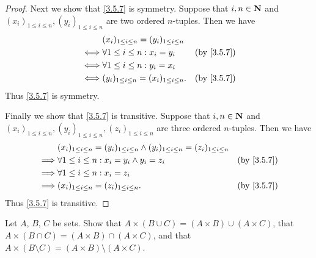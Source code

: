 \begin{proof}
  Next we show that \cref{3.5.7} is symmetry.
  Suppose that \(i, n \in \mathbf{N}\) and \((x_i)_{1 \leq i \leq n}, (y_i)_{1 \leq i \leq n}\) are two ordered \(n\)-tuples.
  Then we have
  \begin{align*}
         & (x_i)_{1 \leq i \leq n} = (y_i)_{1 \leq i \leq n}                             \\
    \iff & \forall 1 \leq i \leq n : x_i = y_i                & \text{(by \cref{3.5.7})} \\
    \iff & \forall 1 \leq i \leq n : y_i = x_i                                           \\
    \iff & (y_i)_{1 \leq i \leq n} = (x_i)_{1 \leq i \leq n}. & \text{(by \cref{3.5.7})}
  \end{align*}
  Thus \cref{3.5.7} is symmetry.

  Finally we show that \cref{3.5.7} is transitive.
  Suppose that \(i, n \in \mathbf{N}\) and \((x_i)_{1 \leq i \leq n}, (y_i)_{1 \leq i \leq n}, (z_i)_{1 \leq i \leq n}\) are three ordered \(n\)-tuples.
  Then we have
  \begin{align*}
             & (x_i)_{1 \leq i \leq n} = (y_i)_{1 \leq i \leq n} \land (y_i)_{1 \leq i \leq n} = (z_i)_{1 \leq i \leq n}                            \\
    \implies & \forall 1 \leq i \leq n : x_i = y_i \land y_i = z_i                                                       & \text{(by \cref{3.5.7})} \\
    \implies & \forall 1 \leq i \leq n : x_i = z_i                                                                                                  \\
    \implies & (x_i)_{1 \leq i \leq n} = (z_i)_{1 \leq i \leq n}.                                                        & \text{(by \cref{3.5.7})}
  \end{align*}
  Thus \cref{3.5.7} is transitive.
\end{proof}

\begin{exercise}\label{ex 3.5.4}
  Let \(A\), \(B\), \(C\) be sets.
  Show that \(A \times (B \cup C) = (A \times B) \cup (A \times C)\), that \(A \times (B \cap C) = (A \times B) \cap (A \times C)\), and that \(A \times (B \setminus C) = (A \times B) \setminus (A \times C)\).
\end{exercise}

